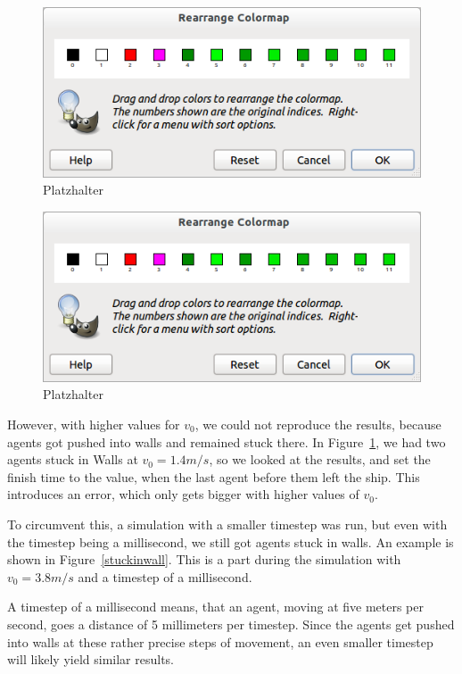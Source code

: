 \documentclass[11pt]{article}
\begin{document}
\begin{figure}[h]
	\centering
	\includegraphics[scale=0.5]{images/gimp.png}
	\caption{Platzhalter}
	\label{evactimes1to11}
	
\end{figure}

\begin{figure}[h]
	\centering
	\includegraphics[scale=0.5]{images/gimp.png}
	\caption{Platzhalter}
	\label{evactimes23to33}
	
\end{figure}

However, with higher values for \(v_0\), we could not reproduce the results, because
agents got pushed into walls and remained stuck there. In Figure~\ref{evactimes1to11},
we had two agents stuck in Walls at \(v_0 = 1.4m/s\), so we looked at the results,
and set the finish time to the value, when the last agent before them left
the ship. This introduces an error, which only gets bigger with higher values of \(v_0\).

To circumvent this, a simulation with a smaller timestep was run, but even with the timestep 
being a millisecond, we still got agents stuck in walls. An example is shown in Figure~\ref{stuckinwall}. This is a part during the simulation with \(v_0 = 3.8m/s\) and a timestep of a millisecond.

A timestep of a millisecond means, that an agent, moving at five meters per second,
goes a distance of 5 millimeters per timestep. Since the agents get pushed into walls
at these rather precise steps of movement, an even smaller timestep will likely yield similar results. 
\end{document}
